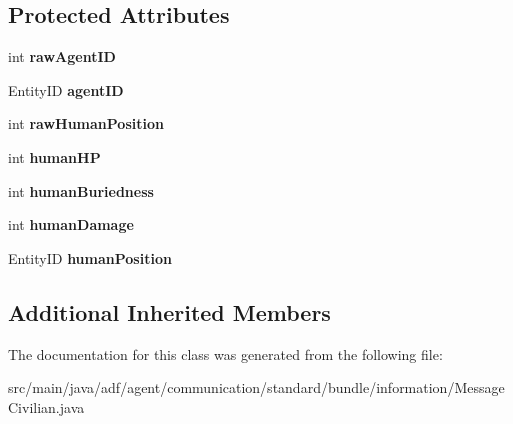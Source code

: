\subsection*{Protected Attributes}
\begin{DoxyCompactItemize}
\item 
\hypertarget{classadf_1_1agent_1_1communication_1_1standard_1_1bundle_1_1information_1_1MessageCivilian_a346852fbbd82851c3ad8ad4a6fa40b7a}{}\label{classadf_1_1agent_1_1communication_1_1standard_1_1bundle_1_1information_1_1MessageCivilian_a346852fbbd82851c3ad8ad4a6fa40b7a} 
int {\bfseries raw\+Agent\+ID}
\item 
\hypertarget{classadf_1_1agent_1_1communication_1_1standard_1_1bundle_1_1information_1_1MessageCivilian_a112a3de877ec62d78865425892a32a2a}{}\label{classadf_1_1agent_1_1communication_1_1standard_1_1bundle_1_1information_1_1MessageCivilian_a112a3de877ec62d78865425892a32a2a} 
Entity\+ID {\bfseries agent\+ID}
\item 
\hypertarget{classadf_1_1agent_1_1communication_1_1standard_1_1bundle_1_1information_1_1MessageCivilian_a050585611974a971ea3cbba84c03d60a}{}\label{classadf_1_1agent_1_1communication_1_1standard_1_1bundle_1_1information_1_1MessageCivilian_a050585611974a971ea3cbba84c03d60a} 
int {\bfseries raw\+Human\+Position}
\item 
\hypertarget{classadf_1_1agent_1_1communication_1_1standard_1_1bundle_1_1information_1_1MessageCivilian_a3cdab5d92aca4113de628890aa8c2909}{}\label{classadf_1_1agent_1_1communication_1_1standard_1_1bundle_1_1information_1_1MessageCivilian_a3cdab5d92aca4113de628890aa8c2909} 
int {\bfseries human\+HP}
\item 
\hypertarget{classadf_1_1agent_1_1communication_1_1standard_1_1bundle_1_1information_1_1MessageCivilian_a0f525a39e26c9a99fefb38512138596d}{}\label{classadf_1_1agent_1_1communication_1_1standard_1_1bundle_1_1information_1_1MessageCivilian_a0f525a39e26c9a99fefb38512138596d} 
int {\bfseries human\+Buriedness}
\item 
\hypertarget{classadf_1_1agent_1_1communication_1_1standard_1_1bundle_1_1information_1_1MessageCivilian_a4a209c83342c40b71fa7d7b1b8cba83a}{}\label{classadf_1_1agent_1_1communication_1_1standard_1_1bundle_1_1information_1_1MessageCivilian_a4a209c83342c40b71fa7d7b1b8cba83a} 
int {\bfseries human\+Damage}
\item 
\hypertarget{classadf_1_1agent_1_1communication_1_1standard_1_1bundle_1_1information_1_1MessageCivilian_ab3f07655291ceb9f384af7227a3c7a8a}{}\label{classadf_1_1agent_1_1communication_1_1standard_1_1bundle_1_1information_1_1MessageCivilian_ab3f07655291ceb9f384af7227a3c7a8a} 
Entity\+ID {\bfseries human\+Position}
\end{DoxyCompactItemize}
\subsection*{Additional Inherited Members}


The documentation for this class was generated from the following file\+:\begin{DoxyCompactItemize}
\item 
src/main/java/adf/agent/communication/standard/bundle/information/Message\+Civilian.\+java\end{DoxyCompactItemize}
